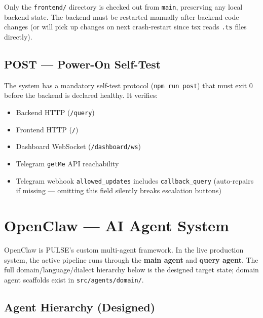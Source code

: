 \documentclass[12pt,a4paper]{article}
\begin{document}
Only the \texttt{frontend/} directory is checked out from \texttt{main}, preserving any
local backend state. The backend must be restarted manually after backend code changes
(or will pick up changes on next crash-restart since tsx reads \texttt{.ts} files directly).

\subsection{POST — Power-On Self-Test}

The system has a mandatory self-test protocol (\texttt{npm run post}) that must exit 0
before the backend is declared healthy. It verifies:
\begin{itemize}[noitemsep]
  \item Backend HTTP (\texttt{/query})
  \item Frontend HTTP (\texttt{/})
  \item Dashboard WebSocket (\texttt{/dashboard/ws})
  \item Telegram \texttt{getMe} API reachability
  \item Telegram webhook \texttt{allowed\_updates} includes \texttt{callback\_query}
    (auto-repairs if missing — omitting this field silently breaks escalation buttons)
\end{itemize}

\section{OpenClaw — AI Agent System}
\label{sec:openclaw}

OpenClaw is PULSE's custom multi-agent framework. In the live production system,
the active pipeline runs through the \textbf{main agent} and \textbf{query agent}.
The full domain/language/dialect hierarchy below is the designed target state;
domain agent scaffolds exist in \texttt{src/agents/domain/}.

\subsection{Agent Hierarchy (Designed)}
\end{document}
